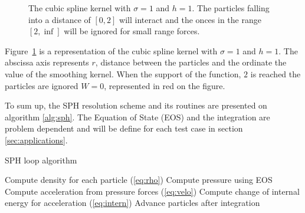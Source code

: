 \begin{figure}[t!]
\centering
{}
\caption[Example of kernel, the Cubic Spline]{The cubic spline kernel with $\sigma = 1$ and $h = 1$. The particles falling into a distance of $[0,2]$ will interact and the onces in the range $[2,\inf]$ will be ignored for small range forces. }
\label{fig:cubic_spline_function}
\end{figure}

Figure~\ref{fig:cubic_spline_function} is a representation of the cubic spline kernel with $\sigma = 1$ and $h = 1$. 
The abscissa axis represents $r$, distance between the particles and the ordinate the value of the smoothing kernel.
When the support of the function, $2$ is reached the particles are ignored $W=0$, represented in red on the figure. 

To sum up, the SPH resolution scheme and its routines are presented on algorithm \ref{alg:sph}.
The Equation of State (EOS) and the integration are problem dependent and will be define for each test case in section \ref{sec:applications}. 

\begin{algorithm}
\caption{SPH loop algorithm}\label{alg:sph}
\begin{algorithmic}[1]
\State Compute density for each particle (\ref{eq:rho})
\State Compute pressure using EOS 
\State Compute acceleration from pressure forces (\ref{eq:velo})
\State Compute change of internal energy for acceleration (\ref{eq:intern})
\State Advance particles after integration
\EndWhile
\end{algorithmic}
\end{algorithm}


